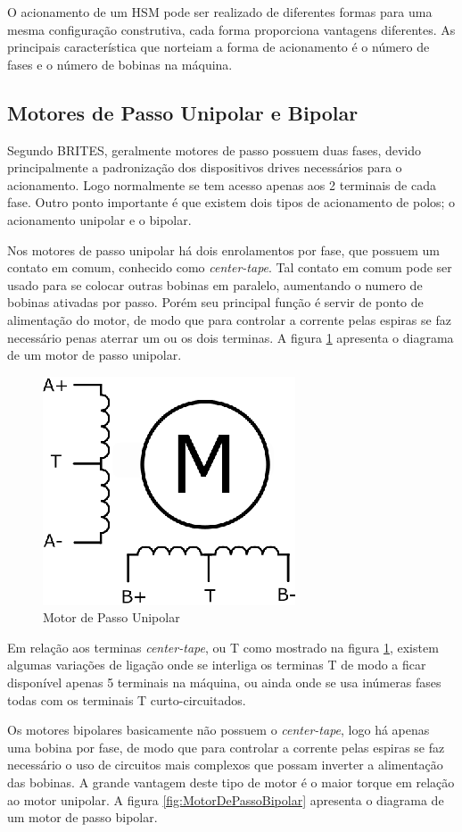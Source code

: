 O acionamento de um HSM pode ser realizado de diferentes formas para uma mesma configuração construtiva, cada forma proporciona vantagens diferentes. As principais característica que norteiam a forma de acionamento  é o número de  fases e o número de bobinas na máquina.

\subsection{Motores de Passo Unipolar e Bipolar}

Segundo BRITES\cite{PETele}, geralmente motores de passo possuem duas fases, devido principalmente a padronização dos dispositivos drives necessários para o acionamento. Logo normalmente se tem acesso apenas aos 2 terminais de cada fase. Outro ponto importante é que existem dois tipos de acionamento de polos; o acionamento unipolar e o bipolar.  

Nos motores de passo unipolar há dois enrolamentos por fase, que possuem um contato em comum, conhecido como \emph{center-tape}. Tal contato em comum pode ser usado para se colocar outras bobinas em paralelo, aumentando o numero de bobinas ativadas por passo. Porém seu principal função é servir de ponto de alimentação do motor, de modo que para controlar a corrente pelas espiras se faz necessário penas aterrar um ou os dois terminas. A figura \ref{fig:MotorDePassoUnipolar} apresenta o diagrama de um motor de passo unipolar. 

\begin{figure}[H]
	\centering
	\includegraphics[width = 0.3 \columnwidth]{images/MotorDePassoUnipolar.eps}
	\caption{Motor de Passo Unipolar}
	\label{fig:MotorDePassoUnipolar}
\end{figure} 

Em relação aos terminas \emph{center-tape}, ou T como mostrado na figura \ref{fig:MotorDePassoUnipolar}, existem algumas variações de ligação onde se interliga os terminas T de modo a ficar disponível apenas 5 terminais na máquina, ou ainda onde se usa inúmeras fases todas com os terminais T curto-circuitados.   

Os motores bipolares basicamente não possuem o \emph{center-tape}, logo há apenas uma bobina por fase, de modo que para controlar a corrente pelas espiras se faz necessário o uso de circuitos mais complexos que possam inverter a alimentação das bobinas. A grande vantagem deste tipo de motor é o maior torque em relação ao motor unipolar. A figura \ref{fig:MotorDePassoBipolar} apresenta o diagrama de um motor de passo bipolar.


